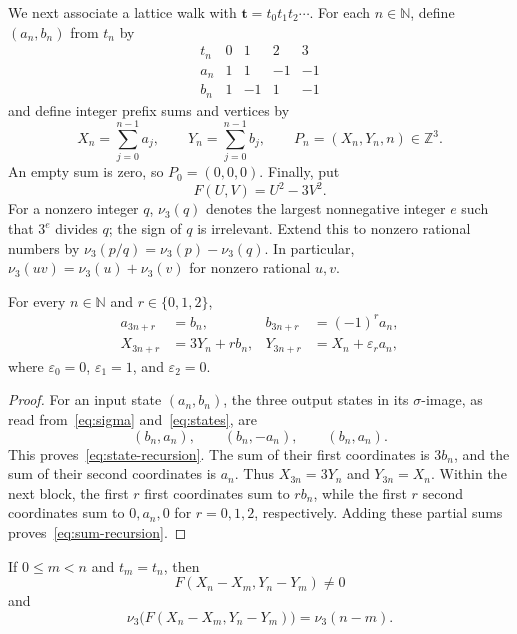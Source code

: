 \documentclass[12pt,reqno]{article}
\newcommand{\Z}{\mathbb Z}
\newcommand{\N}{\mathbb N}
\newcommand{\wt}{\mathbf{t}}
\begin{document}
We next associate a lattice walk with $\wt=t_0t_1t_2\cdots$. For each
$n\in\N$, define $(a_n,b_n)$ from $t_n$ by
\begin{equation}\label{eq:states}
\begin{array}{c|rrrr}
t_n&0&1&2&3\\ \hline
a_n&1&1&-1&-1\\
b_n&1&-1&1&-1
\end{array}
\end{equation}
and define integer prefix sums and vertices by
\begin{equation}\label{eq:vertices}
  X_n=\sum_{j=0}^{n-1}a_j,\qquad
  Y_n=\sum_{j=0}^{n-1}b_j,\qquad
  P_n=(X_n,Y_n,n)\in\Z^3.
\end{equation}
An empty sum is zero, so $P_0=(0,0,0)$. Finally, put
\[
  F(U,V)=U^2-3V^2.
\]
For a nonzero integer $q$, $\nu_3(q)$ denotes the largest nonnegative
integer $e$ such that $3^e$ divides $q$; the sign of $q$ is irrelevant.
Extend this to nonzero rational numbers by
$\nu_3(p/q)=\nu_3(p)-\nu_3(q)$. In particular,
$\nu_3(uv)=\nu_3(u)+\nu_3(v)$ for nonzero rational $u,v$.

\begin{lemma}\label{lem:recursion}
For every $n\in\N$ and $r\in\{0,1,2\}$,
\begin{align}
  a_{3n+r}&=b_n,& b_{3n+r}&=(-1)^r a_n,\label{eq:state-recursion}\\
  X_{3n+r}&=3Y_n+r b_n,&
  Y_{3n+r}&=X_n+\varepsilon_r a_n,\label{eq:sum-recursion}
\end{align}
where $\varepsilon_0=0$, $\varepsilon_1=1$, and $\varepsilon_2=0$.
\end{lemma}

\begin{proof}
For an input state $(a_n,b_n)$, the three output states in its
$\sigma$-image, as read from~\eqref{eq:sigma} and~\eqref{eq:states}, are
\[
  (b_n,a_n),\qquad(b_n,-a_n),\qquad(b_n,a_n).
\]
This proves~\eqref{eq:state-recursion}. The sum of their first
coordinates is $3b_n$, and the sum of their second coordinates is
$a_n$. Thus $X_{3n}=3Y_n$ and $Y_{3n}=X_n$. Within the next block, the
first $r$ first coordinates sum to $r b_n$, while the first $r$ second
coordinates sum to $0,a_n,0$ for $r=0,1,2$, respectively. Adding these
partial sums proves~\eqref{eq:sum-recursion}.
\end{proof}

\begin{lemma}\label{lem:valuation}
If $0\leq m<n$ and $t_m=t_n$, then
\[
  F(X_n-X_m,Y_n-Y_m)\ne0
\]
and
\begin{equation}\label{eq:valuation}
  \nu_3\bigl(F(X_n-X_m,Y_n-Y_m)\bigr)=\nu_3(n-m).
\end{equation}
\end{lemma}
\end{document}
